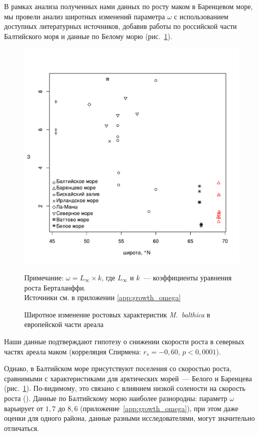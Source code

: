 В рамках анализа полученных нами данных по росту маком в Баренцевом море, мы провели анализ широтных изменений параметра $\omega$ с использованием доступных литературных источников, добавив работы по российской части Балтийского моря и данные по Белому морю (рис.~\ref{ris:omega_vs_lat}).
	\begin{figure}[p]
	\begin{center}	
		\includegraphics[width=\textwidth]{../Growth_sravnenie/long_vs_omega_ru.pdf}
	\end{center}
		\caption{Широтное изменение ростовых характеристик {\it M.~balthica} в европейской части ареала}

	\footnotesize{Примечание: $\omega = L_{\infty} \times k$, где $L_{\infty}$ и $k$~--- коэффициенты уравнения роста Берталанффи.\\ 
	Источники см. в приложении \ref{app:growth_omega}}
		\label{ris:omega_vs_lat}
	\end{figure}
Наши данные подтверждают гипотезу о снижении скорости роста в северных частях ареала маком (корреляция Спирмена: $r_{s} = -0,60$, $p < 0,0001$).

Однако, в Балтийском море присутствуют поселения со скоростью роста, сравнимыми с характеристиками для арктических морей~--- Белого и Баренцева (рис.~\ref{ris:omega_vs_lat}). 
По-видимому, это связано с влиянием низкой солености на скорость роста (\cite{Segerstrale_1960, Kube_et_al_1996}).
Данные по Балтийскому морю наиболее разнородны: параметр $\omega$ варьирует от $1,7$ до $8,6$ (приложение~\ref{app:growth_omega}), при этом даже оценки для одного района, данные разными исследователями, могут значительно отличаться.


